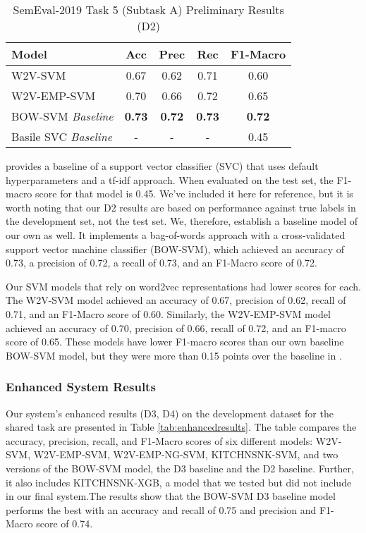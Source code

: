 \documentclass[11pt,a4paper]{article}
\begin{document}
\begin{table}[hbt!]
\centering
\caption{SemEval-2019 Task 5 (Subtask A) Preliminary Results (D2)}
\label{tab:results}
\footnotesize
\begin{tabular}{lcccc}
\hline
Model & Acc & Prec & Rec & F1-Macro \\ \hline
\textsc{W2V-SVM} & 0.67 & 0.62 & 0.71 & 0.60 \\
\textsc{W2V-EMP-SVM} & 0.70 & 0.66 & 0.72 & 0.65 \\
\textsc{BOW-SVM} \textit{Baseline} & \textbf{0.73} & \textbf{0.72} & \textbf{0.73} & \textbf{0.72} \\
Basile SVC \textit{Baseline} & - & - & - & 0.45 \\ \hline
\end{tabular}
\end{table}

\citet{basile-etal-2019-semeval} provides a baseline of a support vector classifier (SVC) that uses default hyperparameters and a tf-idf approach. When evaluated on the test set, the F1-macro score for that model is 0.45. We’ve included it here for reference, but it is worth noting that our D2 results are based on performance against true labels in the development set, not the test set. We, therefore, establish a baseline model of our own as well. It implements a bag-of-words approach with a cross-validated support vector machine classifier (\textsc{BOW-SVM}), which achieved an accuracy of 0.73, a precision of 0.72, a recall of 0.73, and an F1-Macro score of 0.72.

Our SVM models that rely on word2vec representations had lower scores for each. The \textsc{W2V-SVM} model achieved an accuracy of 0.67, precision of 0.62, recall of 0.71, and an F1-Macro score of 0.60. Similarly, the \textsc{W2V-EMP-SVM} model achieved an accuracy of 0.70, precision of 0.66, recall of 0.72, and an F1-macro score of 0.65. These models have lower F1-macro scores than our own baseline \textsc{BOW-SVM} model, but they were more than 0.15 points over the baseline in \citet{basile-etal-2019-semeval}.



\subsubsection{Enhanced System Results}
Our system's enhanced results (D3, D4) on the development dataset for the shared task are presented in Table \ref{tab:enhancedresults}. The table compares the accuracy, precision, recall, and F1-Macro scores of six different models: \textsc{W2V-SVM}, \textsc{W2V-EMP-SVM}, \textsc{W2V-EMP-NG-SVM}, \textsc{KITCHNSNK-SVM}, and two versions of the \textsc{BOW-SVM} model, the D3 baseline and the D2 baseline. Further, it also includes \textsc{KITCHNSNK-XGB}, a model that we tested but did not include in our final system.The results show that the \textsc{BOW-SVM} D3 baseline model performs the best with an accuracy and recall of 0.75 and precision and F1-Macro score of 0.74.
\end{document}
